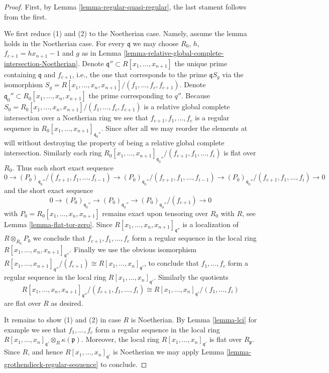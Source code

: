 \begin{proof}
First, by Lemma \ref{lemma-regular-quasi-regular}, the last stament
follows from the first.

\medskip\noindent
We first reduce (1) and (2) to the Noetherian case.
Namely, assume the lemma holds in the Noetherian case.
For every $\mathfrak q$ we may choose $R_0$, $h$,
$f_{c + 1} = hx_{n + 1} - 1$ and $g$
as in Lemma \ref{lemma-relative-global-complete-intersection-Noetherian}.
Denote $\mathfrak q'' \subset R[x_1, \ldots, x_{n + 1}]$ the unique
prime containing $\mathfrak q$ and $f_{c + 1}$, i.e., the one that
corresponds to the prime $\mathfrak qS_g$ via the isomorphism
$S_g = R[x_1, \ldots, x_n, x_{n + 1}]/(f_1, \ldots, f_c, f_{c + 1})$.
Denote $\mathfrak q_0'' \subset R_0[x_1, \ldots, x_n, x_{n + 1}]$
the prime corresponding to $q''$. Because
$S_0 = R_0[x_1, \ldots, x_n, x_{n + 1}]/(f_1, \ldots, f_c, f_{c + 1})$
is a relative global complete intersection over a Noetherian ring
we see that $f_{c + 1}, f_1, \ldots, f_c$ is a regular sequence
in $R_0[x_1,\ldots, x_{n + 1}]_{\mathfrak q_0''}$. Since after all
we may reorder the elements at will without destroying the
property of being a relative global complete intersection.
Similarly each ring
$R_0[x_1,\ldots, x_{n + 1}]_{\mathfrak q_0''}/(f_{c + 1}, f_1, \ldots, f_i)$
is flat over $R_0$. Thus each short exact sequence
$$
0 \to
(P_0)_{\mathfrak q_0''}/(f_{c + 1}, f_1, \ldots, f_{i - 1})
\to
(P_0)_{\mathfrak q_0''}/(f_{c + 1}, f_1, \ldots, f_{i - 1})
\to
(P_0)_{\mathfrak q_0''}/(f_{c + 1}, f_1, \ldots, f_i)
\to
0
$$
and the short exact sequence
$$
0 \to
(P_0)_{\mathfrak q_0''}
\to
(P_0)_{\mathfrak q_0''}
\to
(P_0)_{\mathfrak q_0''}/(f_{c + 1})
\to
0
$$
with $P_0 = R_0[x_1, \ldots, x_n, x_{n + 1}]$ remains exact upon tensoring
over $R_0$ with $R$, see Lemma \ref{lemma-flat-tor-zero}.
Since $R[x_1, \ldots, x_n, x_{n + 1}]_{\mathfrak q''}$ is a
localization of $R \otimes_{R_0} P_0$ we conclude that
$f_{c + 1}, f_1, \ldots, f_c$ form a regular sequence in the local ring
$R[x_1, \ldots, x_n, x_{n + 1}]_{\mathfrak q''}$.
Finally we use the obvious isomorphism
$R[x_1, \ldots, x_{n + 1}]_{\mathfrak q''}/(f_{c + 1})
\cong R[x_1, \ldots, x_n]_{\mathfrak q'}$, to conclude that
$f_1, \ldots, f_c$ form a regular sequence in the local ring
$R[x_1, \ldots, x_n]_{\mathfrak q'}$. Similarly
the quotients
$$
R[x_1, \ldots, x_n, x_{n + 1}]_{\mathfrak q''}/(f_{c + 1}, f_1, \ldots, f_i)
\cong R[x_1, \ldots, x_n]_{\mathfrak q'}/(f_1, \ldots, f_i)
$$
are flat over $R$ as desired.

\medskip\noindent
It remains to show (1) and (2) in case $R$ is Noetherian.
By Lemma \ref{lemma-lci} for example we see that $f_1, \ldots, f_c$
form a regular sequence in the local ring
$R[x_1, \ldots, x_n]_{\mathfrak q'}\otimes_R \kappa(\mathfrak p)$.
Moreover, the local ring $R[x_1, \ldots, x_n]_{\mathfrak q'}$
is flat over $R_{\mathfrak p}$. Since $R$, and hence
$R[x_1, \ldots, x_n]_{\mathfrak q'}$ is Noetherian we
may apply Lemma \ref{lemma-grothendieck-regular-sequence}
to conclude.
\end{proof}

